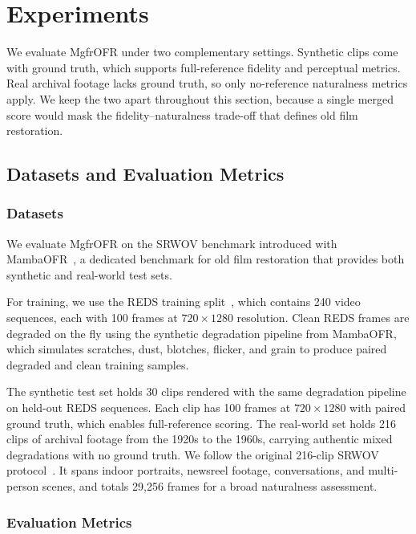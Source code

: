 \section{Experiments}
\label{sec:experiment}

We evaluate MgfrOFR under two complementary settings. Synthetic clips come with ground truth, which supports full-reference fidelity and perceptual metrics. Real archival footage lacks ground truth, so only no-reference naturalness metrics apply. We keep the two apart throughout this section, because a single merged score would mask the fidelity--naturalness trade-off that defines old film restoration.

\subsection{Datasets and Evaluation Metrics}
\label{subsec:datasets_metrics}

\subsubsection{Datasets}
\label{subsec:datasets}

We evaluate MgfrOFR on the SRWOV benchmark introduced with MambaOFR~\cite{mao2025mambaofr}, a dedicated benchmark for old film restoration that provides both synthetic and real-world test sets.

For training, we use the REDS training split~\cite{nah2019reds}, which contains 240 video sequences, each with 100 frames at $720 \times 1280$ resolution. Clean REDS frames are degraded on the fly using the synthetic degradation pipeline from MambaOFR, which simulates scratches, dust, blotches, flicker, and grain to produce paired degraded and clean training samples.

The synthetic test set holds 30 clips rendered with the same degradation pipeline on held-out REDS sequences. Each clip has 100 frames at $720 \times 1280$ with paired ground truth, which enables full-reference scoring. The real-world set holds 216 clips of archival footage from the 1920s to the 1960s, carrying authentic mixed degradations with no ground truth. We follow the original 216-clip SRWOV protocol~\cite{mao2025mambaofr}. It spans indoor portraits, newsreel footage, conversations, and multi-person scenes, and totals 29{,}256 frames for a broad naturalness assessment.

\subsubsection{Evaluation Metrics}
\label{subsec:eval_metrics}

